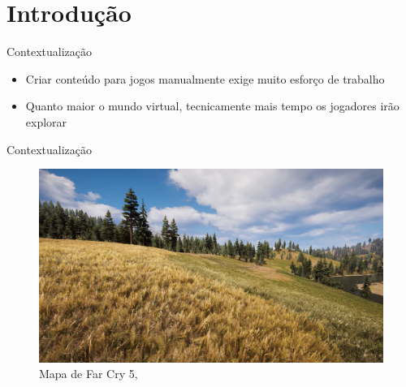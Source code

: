 \section{Introdução}

\begin{frame}{Contextualização}
  \begin{itemize}
        \item Criar conteúdo para jogos manualmente exige muito esforço de trabalho
        \item Quanto maior o mundo virtual, tecnicamente mais tempo os jogadores irão explorar \cite{bevilacqua2009ferramenta}
    \end{itemize}
\end{frame}

\begin{frame}{Contextualização}
  \begin{figure}
		\centering
        \includegraphics[width=.8\textwidth]{img/intro/fc5terrain.png}
        \caption{Mapa de \alert{Far Cry 5}, \cite{Carrier2018farcry5}}
  \end{figure}
\end{frame}